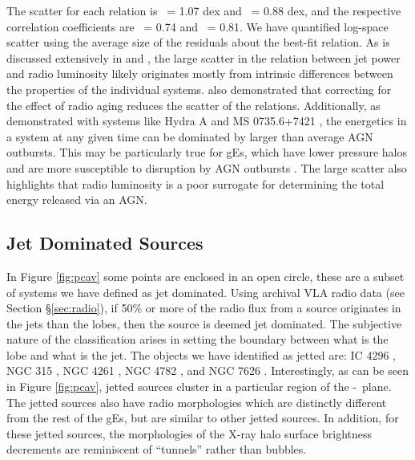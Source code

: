 \documentclass{emulateapj}
\begin{document}
The scatter for each relation is \shigh\ = 1.07 dex and \slow\ = 0.88
dex, and the respective correlation coefficients are \rhigh\ = 0.74
and \rlow\ = 0.81. We have quantified log-space scatter using the
average size of the residuals about the best-fit relation. As is
discussed extensively in \citet{birzan04} and \citet{birzan08}, the
large scatter in the relation between jet power and radio luminosity
likely originates mostly from intrinsic differences between the
properties of the individual systems. \citet{birzan08} also
demonstrated that correcting for the effect of radio aging reduces the
scatter of the relations. Additionally, as demonstrated with systems
like Hydra A \citep{hydraa} and MS 0735.6+7421 \citep{ms0735,
  2009ApJ...698..594M}, the energetics in a system at any given time
can be dominated by larger than average AGN outbursts. This may be
particularly true for gEs, which have lower pressure halos and are
more susceptible to disruption by AGN outbursts \citep{minggroups}.
The large scatter also highlights that radio luminosity is a poor
surrogate for determining the total energy released via an AGN.

\subsection{Jet Dominated Sources}
\label{sec:jet}

In Figure \ref{fig:pcav} some points are enclosed in an open circle,
these are a subset of systems we have defined as jet dominated. Using
archival VLA radio data (see Section \S\ref{sec:radio}), if 50\% or
more of the radio flux from a source originates in the jets than the
lobes, then the source is deemed jet dominated. The subjective nature
of the classification arises in setting the boundary between what is
the lobe and what is the jet. The objects we have identified as jetted
are: IC 4296 \citep{2003ApJ...585..677P}, NGC 315
\citep{1979ApJ...228L...9B, 1981A&A....95..250W}, NGC 4261
\citep{1997ApJ...484..186J, 2000ApJ...534..165J}, NGC 4782
\citep{2007ApJ...664..804M}, and NGC 7626
\citep{1985ApJ...291...32B}. Interestingly, as can be seen in Figure
\ref{fig:pcav}, jetted sources cluster in a particular region of the
\pjet-\prad\ plane. The jetted sources also have radio morphologies
which are distinctly different from the rest of the gEs, but are
similar to other jetted sources. In addition, for these jetted
sources, the morphologies of the X-ray halo surface brightness
decrements are reminiscent of ``tunnels'' rather than bubbles.
\end{document}
